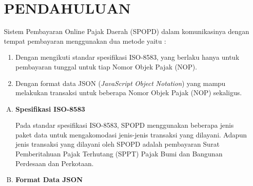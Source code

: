 \chapter{PENDAHULUAN}

Sistem Pembayaran Online Pajak Daerah (SPOPD) dalam komunikasinya dengan tempat pembayaran menggunakan dua metode yaitu :

\begin{enumerate}[1.]
  \item Dengan mengikuti standar spesifikasi ISO-8583, yang berlaku hanya untuk pembayaran tunggal untuk tiap Nomor Objek Pajak (NOP).
  
  \item Dengan format data JSON (\textit{JavaScript Object Notation}) yang mampu melakukan transaksi untuk beberapa Nomor Objek Pajak (NOP) sekaligus.
\end{enumerate}

\begin{enumerate}[A.]

\item \textbf{Spesifikasi ISO-8583}

Pada standar spesifikasi ISO-8583, SPOPD menggunakan beberapa jenis paket data untuk mengakomodasi jenis-jenis transaksi yang dilayani. Adapun jenis transaksi yang dilayani oleh SPOPD adalah pembayaran Surat Pemberitahuan Pajak Terhutang (SPPT) Pajak Bumi dan Bangunan Perdesaan dan Perkotaan.

\item \textbf{Format Data JSON}

\end{enumerate}